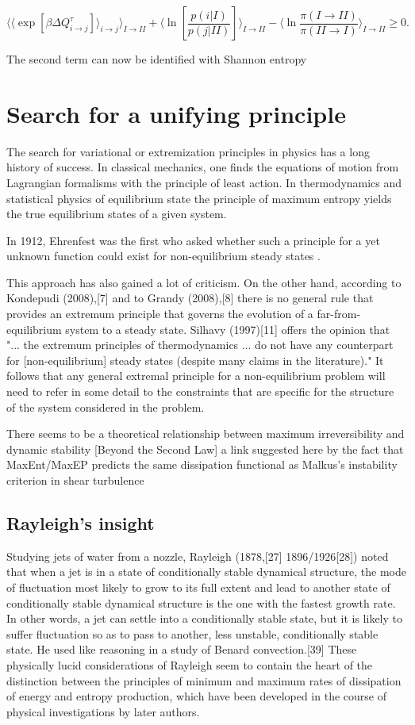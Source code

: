 \documentclass[a4paper,12pt]{article}
\begin{document}
\begin{equation}
  \langle \langle \exp[\beta  \Delta Q_{i\to j}^{\tau}] \rangle_{i \to j} \rangle_{I \to II}+\langle \ln[\frac{p(i|I)}{p(j|II)}]  \rangle_{I \to II}-\langle \ln{\frac{\pi(I \to II)}{\pi(II \to I)}}  \rangle_{I \to II}\geq 0.
\end{equation}

The second term can now be identified with Shannon entropy
\section{Search for a unifying principle}

The search for variational or extremization principles in physics has a long history of success. In classical mechanics, one finds the equations of motion from Lagrangian formalisms with the principle of least action. In thermodynamics and statistical physics of equilibrium state the principle of maximum entropy yields the true equilibrium states of a given system. 

In 1912, Ehrenfest was the first who asked whether such a principle for a yet unknown function could exist for non-equilibrium steady states . 

This approach has also gained a lot of criticism.
On the other hand, according to Kondepudi (2008),[7] and to Grandy (2008),[8] there is no general rule that provides an extremum principle that governs the evolution of a far-from-equilibrium system to a steady state. 
Silhavy (1997)[11] offers the opinion that "... the extremum principles of thermodynamics ... do not have any counterpart for [non-equilibrium] steady states (despite many claims in the literature)." It follows that any general extremal principle for a non-equilibrium problem will need to refer in some detail to the constraints that are specific for the structure of the system considered in the problem.

There seems to be a theoretical relationship between maximum irreversibility and dynamic stability [Beyond the Second Law] a link suggested here by the fact that MaxEnt/MaxEP predicts the same dissipation functional as Malkus's instability criterion in shear turbulence

\subsection{Rayleigh's insight}
Studying jets of water from a nozzle, Rayleigh (1878,[27] 1896/1926[28]) noted that when a jet is in a state of conditionally stable dynamical structure, the mode of fluctuation most likely to grow to its full extent and lead to another state of conditionally stable dynamical structure is the one with the fastest growth rate. In other words, a jet can settle into a conditionally stable state, but it is likely to suffer fluctuation so as to pass to another, less unstable, conditionally stable state. He used like reasoning in a study of Benard convection.[39] These physically lucid considerations of Rayleigh seem to contain the heart of the distinction between the principles of minimum and maximum rates of dissipation of energy and entropy production, which have been developed in the course of physical investigations by later authors.
\end{document}
